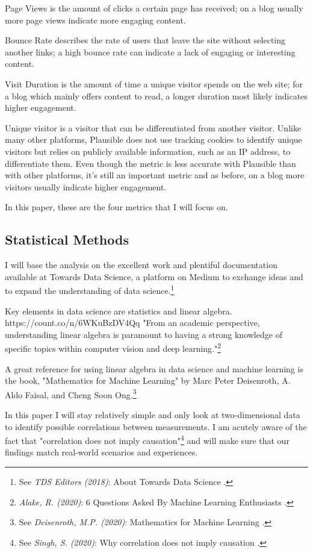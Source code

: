 Page Views is the amount of clicks a certain page has received; on a blog usually more page views indicate more engaging content.

Bounce Rate describes the rate of users that leave the site without selecting another links; a high bounce rate can indicate a lack of engaging or interesting content.

Visit Duration is the amount of time a unique visitor spends on the web site; for a blog which mainly offers content to read, a longer duration most likely indicates higher engagement.

Unique visitor is a visitor that can be differentiated from another visitor. Unlike many other platforms, Plausible does not use tracking cookies to identify unique visitors but relies on publicly available information, such as an IP address, to differentiate them. Even though the metric is less accurate with Plausible than with other platforms, it's still an important metric and as before, on a blog more visitors usually indicate higher engagement.

In this paper, these are the four metrics that I will focus on.

\subsection{Statistical Methods}

I will base the analysis on the excellent work and plentiful documentation available at Towards Data Science, a platform on Medium to exchange ideas and to expand the understanding of data science.\footnote{See \textit{TDS Editors (2018)}: About Towards Data Science .\cite{aboutTDS}}

Key elements in data science are statistics and linear algebra.
https://count.co/n/6WKuBzDV4Qq
"From an academic perspective, understanding linear algebra is paramount to having a strong knowledge of specific topics within computer vision and deep learning."\footnote{\textit{Alake, R. (2020)}: 6 Questions Asked By Machine Learning Enthusiasts .\cite{sixQuestions}}

A great reference for using linear algebra in data science and machine learning is the book, "Mathematics for Machine Learning" by Marc Peter Deisenroth, A. Aldo Faisal, and Cheng Soon Ong.\footnote{See \textit{Deisenroth, M.P. (2020)}: Mathematics for Machine Learning .\cite{mathematicsML}}

In this paper I will stay relatively simple and only look at two-dimensional data to identify possible correlations between measurements. I am acutely aware of the fact that "correlation does not imply causation"\footnote{See \textit{Singh, S. (2020)}: Why correlation does not imply causation .\cite{correlateCause}} and will make sure that our findings match real-world scenarios and experiences.

